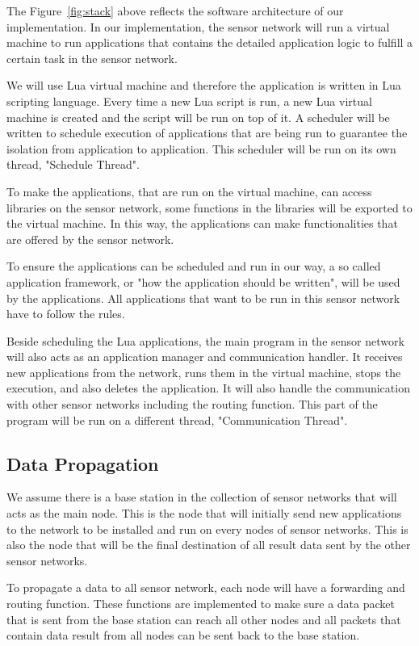 \documentclass[a4paper,11pt]{article}
\begin{document}
The Figure~\ref{fig:stack} above reflects the software architecture of our
implementation. In our implementation, the sensor network will run a virtual
machine to run applications that contains the detailed application logic to
fulfill a certain task in the sensor network.

We will use Lua virtual machine and therefore the application is written in Lua
scripting language. Every time a new Lua script is run, a new Lua virtual
machine is created and the script will be run on top of it. A scheduler will be
written to schedule execution of applications that are being run to guarantee
the isolation from application to application. This scheduler will be run on
its own thread, "Schedule Thread".

To make the applications, that are run on the virtual machine, can access
libraries on the sensor network, some functions in the libraries will be
exported to the virtual machine. In this way, the applications can make
functionalities that are offered by the sensor network.

To ensure the applications can be scheduled and run in our way, a so called
application framework, or "how the application should be written", will be used
by the applications. All applications that want to be run in this sensor
network have to follow the rules.

Beside scheduling the Lua applications, the main program in the sensor network
will also acts as an application manager and communication handler. It receives
new applications from the network, runs them in the virtual machine, stops the
execution, and also deletes the application. It will also handle the
communication with other sensor networks including the routing function. This
part of the program will be run on a different thread, "Communication Thread".

\subsection{Data Propagation}

We assume there is a base station in the collection of sensor networks that
will acts as the main node. This is the node that will initially send new
applications to the network to be installed and run on every nodes of sensor
networks. This is also the node that will be the final destination of all
result data sent by the other sensor networks.

To propagate a data to all sensor network, each node will have a forwarding and
routing function. These functions are implemented to make sure a data packet
that is sent from the base station can reach all other nodes and all packets
that contain data result from all nodes can be sent back to the base station.
\end{document}
